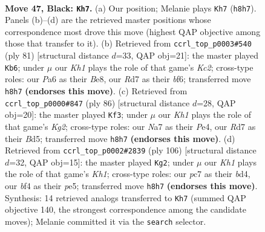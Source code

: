 \documentclass[11pt]{article}
\begin{document}
\clearpage

\begin{figure}[p]\centering
\begin{subfigure}{0.46\textwidth}\centering
\resizebox{\linewidth}{!}{%
\newchessgame
\chessboard[
  setfen={5K1k/n1Pr4/p7/P4p1p/4pB2/5bP1/8/RN6 b - - 1 47},
  showmover=false,
  pgfstyle=straightmove, color=movearrow, markmove={h8-h7}
]}
\caption{}
\end{subfigure}\hfill
\begin{subfigure}{0.46\textwidth}\centering
\resizebox{\linewidth}{!}{%
\newchessgame
\chessboard[
  setfen={4b3/2k5/5Bp1/1P2pp1p/7P/1R3P2/6r1/4K3 b - - 1 41},
  showmover=false,
  pgfstyle=straightmove, color=movearrow, markmove={c7-b6}
]}
\caption{}
\end{subfigure}
\\[4pt]
\begin{subfigure}{0.46\textwidth}\centering
\resizebox{\linewidth}{!}{%
\newchessgame
\chessboard[
  setfen={8/3r1pk1/2Rp4/3Bb1pP/4P1P1/8/6K1/8 w - - 3 44},
  showmover=false,
  pgfstyle=straightmove, color=movearrow, markmove={g2-f3}
]}
\caption{}
\end{subfigure}\hfill
\begin{subfigure}{0.46\textwidth}\centering
\resizebox{\linewidth}{!}{%
\newchessgame
\chessboard[
  setfen={r7/5k2/1p4p1/3Pp2p/2PbB2P/6P1/3R4/7K w - - 12 54},
  showmover=false,
  pgfstyle=straightmove, color=movearrow, markmove={h1-g2}
]}
\caption{}
\end{subfigure}
\caption{\textbf{Move 47, Black: \texttt{Kh7}.} (a) Our position; Melanie plays \texttt{Kh7} (\texttt{h8h7}). Panels (b)--(d) are the retrieved master positions whose correspondence most drove this move (highest QAP objective among those that transfer to it). (b) Retrieved from \texttt{ccrl\_top\_p0003\#540} (ply 81) [structural distance $d$=33, QAP obj=21]: the master played \texttt{Kb6}; under $\mu$ our \emph{Kh1} plays the role of that game's \emph{Kc2}; cross-type roles: our \emph{P}a6 as their \emph{B}e8, our \emph{R}d7 as their \emph{b}f6; transferred move \texttt{h8h7} \textbf{(endorses this move)}. (c) Retrieved from \texttt{ccrl\_top\_p0000\#847} (ply 86) [structural distance $d$=28, QAP obj=20]: the master played \texttt{Kf3}; under $\mu$ our \emph{Kh1} plays the role of that game's \emph{Kg2}; cross-type roles: our \emph{N}a7 as their \emph{P}e4, our \emph{R}d7 as their \emph{B}d5; transferred move \texttt{h8h7} \textbf{(endorses this move)}. (d) Retrieved from \texttt{ccrl\_top\_p0002\#2839} (ply 106) [structural distance $d$=32, QAP obj=15]: the master played \texttt{Kg2}; under $\mu$ our \emph{Kh1} plays the role of that game's \emph{Kh1}; cross-type roles: our \emph{p}c7 as their \emph{b}d4, our \emph{b}f4 as their \emph{p}e5; transferred move \texttt{h8h7} \textbf{(endorses this move)}. Synthesis: 14 retrieved analogs transferred to \texttt{Kh7} (summed QAP objective 140, the strongest correspondence among the candidate moves); Melanie committed it via the \texttt{search} selector.}
\label{fig:thought-m93}
\end{figure}
\end{document}
